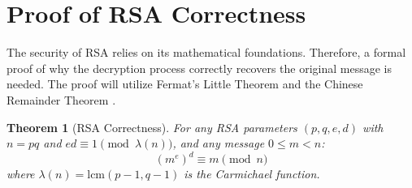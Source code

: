 \documentclass[11pt,a4paper]{article}
\newtheorem{theorem}{Theorem}[section]
\numberwithin{equation}{section}
\begin{document}
\newpage 

\section{Proof of RSA Correctness}

The security of RSA relies on its mathematical foundations. Therefore, a formal proof of why the decryption process correctly recovers the original message is needed. The proof will utilize Fermat's Little Theorem and the Chinese Remainder Theorem \cite{wikiRSA}.
\begin{theorem}[RSA Correctness]
For any RSA parameters $(p, q, e, d)$ with $n = pq$ and $ed \equiv 1 \pmod{\lambda(n)}$, and any message $0 \leq m < n$:
\[(m^e)^d \equiv m \pmod{n}\]
where $\lambda(n) = \text{lcm}(p-1, q-1)$ is the Carmichael function.
\end{theorem}
\end{document}
